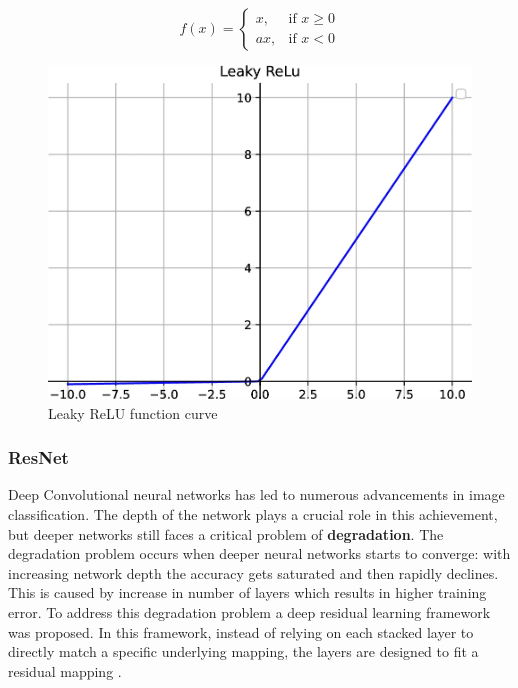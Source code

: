 \[
f(x) =
\begin{cases} 
    x, & \text{if } x \geq 0 \\
    ax, & \text{if } x < 0 
\end{cases}
\]

\begin{figure}[H]
    \centering
    \includegraphics[width=1\linewidth]{Rohit_Master_Thesis//Images/leaky_relu_af.png}
    \caption{Leaky ReLU function curve \cite{Zhao2024}}
    \label{fig:leaky relu function curve}
\end{figure}

\subsubsection{ResNet}
\label{subsec:ResNet}

Deep Convolutional neural networks has led to numerous advancements in image classification. The depth of the network plays a crucial role in this achievement, but deeper networks still faces a critical problem of \textbf{degradation}. The degradation problem occurs when deeper neural networks starts to converge: with increasing network depth the accuracy gets saturated and then rapidly declines. This is caused by increase in number of layers which results in higher training error. To address this degradation problem a deep residual learning framework was proposed. In this framework, instead of relying on each stacked layer to directly match a specific underlying mapping, the layers are designed to fit a residual mapping \cite{he2016deep}.

